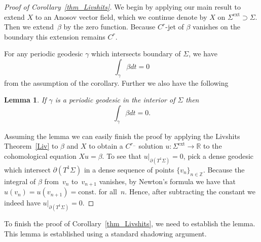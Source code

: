 \documentclass[10pt]{amsart}
\newcommand{\ext}{\mathrm{ext}}
\newtheorem{lemma}[theorem]{Lemma}
\theoremstyle{definition}
\renewcommand{\>}{{\rangle}}
\newcommand{\<}{{\langle}}
\begin{document}
\begin{proof}[Proof of Corollary~\ref{thm_Livshits}]
We begin by applying our main result to extend $X$ to an Anosov vector field, which we continue denote by $X$ on $\Sigma^{\ext}\supset\Sigma$. Then we extend~$\beta$ by the zero function. Because $C^r$-jet of $\beta$ vanishes on the boundary this extension remains $C^r$.

For any periodic geodesic $\gamma$ which intersects boundary of $\Sigma$, we have
\[
\int_\gamma \beta dt=0
\]
from the assumption of the corollary. Further we also have the following
\begin{lemma}
\label{lemma_aprx}
If $\gamma$ is a periodic geodesic in the interior of $\Sigma$ then
\[
\int_\gamma \beta dt=0.
\]
\end{lemma}

Assuming the lemma we can easily finish the proof by applying the Livshits Theorem~\ref{Liv} to $\beta$ and $X$ to obtain a $C^{r_-}$ solution $u\colon\Sigma^{\ext}\to\mathbb R$ to the cohomological equation $Xu=\beta$.
To see that $u|_{\partial(T^1\Sigma)}=0$, pick a dense geodesic which intersect $\partial(T^1\Sigma)$ in a dense sequence of points $\{v_n\}_{n\in\mathbb Z}$. Because the integral of $\beta$ from~$v_n$ to~$v_{n+1}$ vanishes, by Newton's formula we have that $u(v_n)=u(v_{n+1})=\text{const.}$ for all~$n$. Hence, after subtracting the constant we indeed have $u|_{\partial(T^1\Sigma)}=0$.
\end{proof}
To finish the proof of Corollary~\ref{thm_Livshits}, we need to establish the lemma. This lemma is established using a standard shadowing argument.
\end{document}
